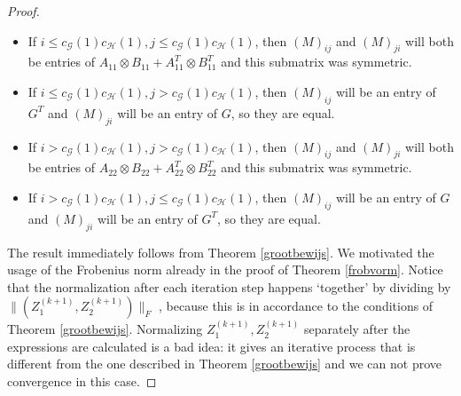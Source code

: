 \documentclass[a4paper,11pt]{report}
\newcommand{\graf}{\mathscr{G}}
\newcommand{\grafeen}{\mathscr{H}}
\begin{document}
\begin{proof}
\begin{itemize}
  \item If $i \leq c_\graf(1)c_\grafeen(1), j \leq c_\graf(1)c_\grafeen(1)$, 
  then $(M)_{ij}$ and $(M)_{ji}$ will both be entries of $A_{11}\otimes B_{11} + A^T_{11}\otimes B^T_{11}$ and this submatrix was symmetric.
  \item If $i \leq c_\graf(1)c_\grafeen(1), j > c_\graf(1)c_\grafeen(1)$, then $(M)_{ij}$ 
  will be an entry of $G^T$ and $(M)_{ji}$ will be an entry of $G$, so they are 
  equal.
  \item If $i > c_\graf(1)c_\grafeen(1), j > c_\graf(1)c_\grafeen(1)$, then $(M)_{ij}$ and $(M)_{ji}$ will both be entries of $A_{22}\otimes B_{22} + A^T_{22}\otimes B^T_{22}$ and this submatrix was symmetric.
   \item If $i > c_\graf(1)c_\grafeen(1), j \leq c_\graf(1)c_\grafeen(1)$, then $(M)_{ij}$ 
  will be an entry of $G$ and $(M)_{ji}$ will be an entry of $G^T$, so they are 
  equal.
  \end{itemize}

The result immediately follows from Theorem \ref{grootbewijs}. We motivated the usage of the Frobenius norm
already in the proof of  Theorem \ref{frobvorm}. Notice that the normalization after each iteration step happens 
`together' by dividing by $\|(Z^{(k+1)}_1, Z^{(k+1)}_2)\|_F$ , because this is in accordance to the conditions of Theorem \ref{grootbewijs}.
Normalizing $Z^{(k+1)}_1, Z^{(k+1)}_2$ separately after the expressions are 
calculated is a bad idea: it gives an iterative process that is different from the one described 
in Theorem \ref{grootbewijs} and we can not prove convergence in this case.


\end{proof}
\end{document}
